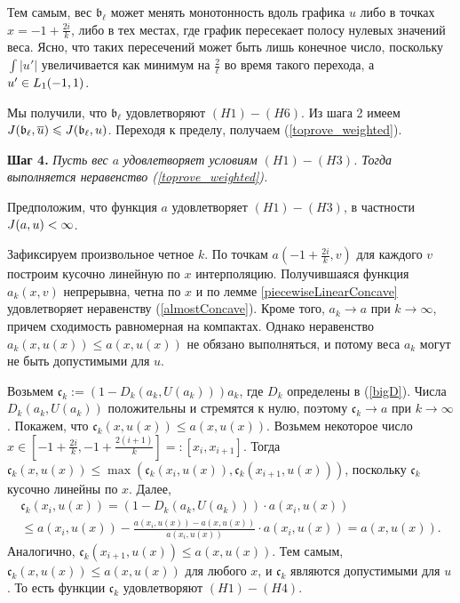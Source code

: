 Тем самым, вес $\mathfrak  b_{\ell}$ может менять монотонность вдоль графика $u$
либо в точках $x = -1 + \frac{2 i}{k}$, либо в тех местах, где график пересекает полосу нулевых значений веса.
Ясно, что таких пересечений может быть лишь конечное число, поскольку
$\int |u'|$ увеличивается как минимум на $\frac{2}{\ell}$ во время такого перехода, а $u' \in L_1(-1, 1)$.

Мы получили, что $\mathfrak b_{\ell}$ удовлетворяют $(H1)-(H6)$.
Из шага 2 имеем $\IWg(\mathfrak b_{\ell}, \mon{u}) \le \IWg(\mathfrak b_{\ell}, u)$.
Переходя к пределу, получаем (\ref{toprove_weighted}).

\bigskip
\textbf{Шаг 4.}
\textit{Пусть вес $a$ удовлетворяет условиям $(H1)-(H3)$.
Тогда выполняется неравенство (\ref{toprove_weighted}).}

Предположим, что функция  $a$ удовлетворяет $(H1)-(H3)$, в частности $J(a, u) < \infty$.

Зафиксируем произвольное четное $k$.
По точкам $a(-1 + \frac{2i}{k}, v)$ для каждого $v$ построим кусочно линейную по $x$ интерполяцию.
Получившаяся функция $a_k(x, v)$ непрерывна, четна по $x$
и по лемме \ref{piecewiseLinearConcave} удовлетворяет неравенству (\ref{almostConcave}).
Кроме того, $a_k \to a$ при $k \to \infty$, причем сходимость равномерная на компактах.
Однако неравенство $a_k(x, u(x)) \le a(x, u(x))$ не обязано выполняться,
и потому веса $a_k$ могут не быть допустимыми для $u$.

Возьмем $\mathfrak c_k := (1 - D_k(a_k, U(a_k))) a_k$, где $D_k$ определены в (\ref{bigD}).
Числа $D_k(a_k, U(a_k))$ положительны и стремятся к нулю, поэтому $\mathfrak c_k \to a$ при $k \to \infty$.
Покажем, что $\mathfrak c_k(x, u(x)) \le a(x, u(x))$.
Возьмем некоторое число
$x \in [-1 + \frac{2i}{k}, -1 + \frac{2(i + 1)}{k}] =: [x_i, x_{i + 1}]$.
Тогда $\mathfrak c_k(x, u(x)) \le \max( \mathfrak c_k(x_i, u(x)), \mathfrak c_k(x_{i + 1}, u(x)) )$,
поскольку $\mathfrak c_k$ кусочно линейны по $x$.
Далее,
\begin{multline*}
\mathfrak c_k(x_i, u(x)) = ( 1 - D_k(a_k, U(a_k))) \cdot a(x_i, u(x)) \\
\le a(x_i, u(x)) - \frac{a(x_i, u(x)) - a(x, u(x))}{a(x_i, u(x))} \cdot a(x_i, u(x)) = a(x, u(x)).
\end{multline*}
Аналогично, $\mathfrak c_k(x_{i + 1}, u(x)) \le a(x, u(x))$.
Тем самым, $\mathfrak c_k(x, u(x)) \le a(x, u(x))$ для любого $x$, и $\mathfrak c_k$ являются допустимыми для $u$.
То есть функции $\mathfrak c_k$ удовлетворяют $(H1)-(H4)$.

